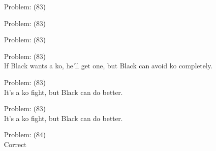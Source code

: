 \documentclass[11pt]{article}
\begin{document}
\begin{minipage}[t]{0.5\textwidth}
  {\centering
  
  Problem: (83)\\
  
  }
\end{minipage}
\begin{minipage}[t]{0.5\textwidth}
  {\centering
  
  Problem: (83)\\
  
  }
\end{minipage}
\begin{minipage}[t]{0.5\textwidth}
  {\centering
  
  Problem: (83)\\
  
  }
\end{minipage}
\begin{minipage}[t]{0.5\textwidth}
  {\centering
  
  Problem: (83)\\
  If Black wants a ko, he'll get one, but Black can avoid ko completely.\\
  }
\end{minipage}
\begin{minipage}[t]{0.5\textwidth}
  {\centering
  
  Problem: (83)\\
  It's a ko fight, but Black can do better.\\
  }
\end{minipage}
\begin{minipage}[t]{0.5\textwidth}
  {\centering
  
  Problem: (83)\\
  It's a ko fight, but Black can do better.\\
  }
\end{minipage}
\begin{minipage}[t]{0.5\textwidth}
  {\centering
  
  Problem: (84)\\
  Correct\\
  }
\end{minipage}
\end{document}
